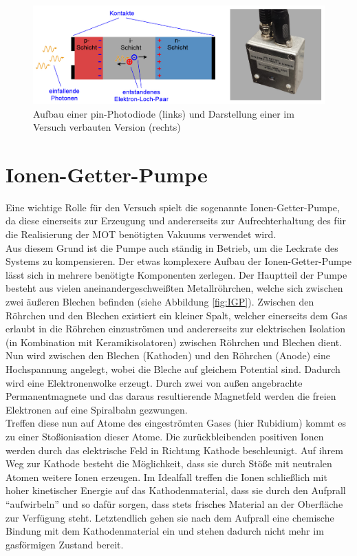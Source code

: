 \documentclass[
class=book,
accentcolor=1b,
custommargins=geometry,
fontsize=11pt,
thesis={type=Versuchsanleitung},
ruledheaders=all,
headline=false,
instbox=false,
marginpar=false,
title=small,
ignore-missing-data=true,
twoside=false,
logofile=apqdesign/tuda_logo.pdf,
pdfa=false %
]{apqpub}
\begin{document}
			\begin{figure}[htb!]
				\centering
				\includegraphics[width=\textwidth]{graphics/PDI.jpg}
				\caption{Aufbau einer pin-Photodiode (links)
					und Darstellung einer im Versuch verbauten Version (rechts)}
				\label{fig:PDI}
			\end{figure}

			\section{Ionen-Getter-Pumpe}			
			Eine wichtige Rolle für den Versuch spielt die sogenannte Ionen-Getter-Pumpe, da diese einerseits zur Erzeugung und andererseits zur Aufrechterhaltung des für die Realisierung der MOT benötigten Vakuums verwendet wird.\\
			Aus diesem Grund ist die Pumpe auch ständig in Betrieb, um die Leckrate des Systems zu kompensieren. Der etwas komplexere Aufbau der Ionen-Getter-Pumpe lässt sich in mehrere benötigte Komponenten zerlegen. Der Hauptteil der Pumpe besteht aus vielen aneinandergeschweißten Metallröhrchen, welche sich zwischen zwei äußeren Blechen befinden (siehe Abbildung \ref{fig:IGP}). Zwischen den Röhrchen und den Blechen existiert ein kleiner Spalt, welcher einerseits dem Gas erlaubt in die Röhrchen einzuströmen und andererseits zur elektrischen Isolation (in Kombination mit Keramikisolatoren) zwischen Röhrchen und Blechen dient. Nun wird zwischen den Blechen (Kathoden) und den Röhrchen (Anode) eine Hochspannung angelegt, wobei die Bleche auf gleichem Potential sind. Dadurch wird eine Elektronenwolke erzeugt. Durch zwei von außen angebrachte Permanentmagnete und das daraus resultierende Magnetfeld werden die freien Elektronen auf eine Spiralbahn gezwungen.\\

			Treffen diese nun auf Atome des eingeströmten Gases (hier Rubidium) kommt es zu einer Stoßionisation dieser Atome. Die zurückbleibenden positiven Ionen werden durch das elektrische Feld in Richtung Kathode beschleunigt. Auf ihrem Weg zur Kathode besteht die Möglichkeit, dass sie durch Stöße mit neutralen Atomen weitere Ionen erzeugen. Im Idealfall treffen die Ionen schließlich mit hoher kinetischer Energie auf das Kathodenmaterial, dass sie durch den Aufprall ``aufwirbeln'' und so dafür sorgen, dass stets frisches Material an der Oberfläche zur Verfügung steht. Letztendlich gehen sie nach dem Aufprall eine chemische Bindung mit dem Kathodenmaterial ein und stehen dadurch nicht mehr im gasförmigen Zustand bereit.
			
\end{document}
